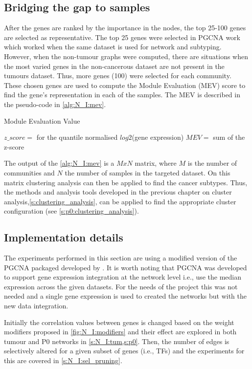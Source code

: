 \subsection{Bridging the gap to samples} \label{s:N_I:mev}

After the genes are ranked by the importance in the nodes, the top 25-100 genes are selected as representative. The top 25 genes were selected in PGCNA work \citep{Care2019-ij} which worked when the same dataset is used for network and subtyping. However, when the non-tumour graphs were computed, there are situations when the most varied genes in the non-cancerous dataset are not present in the tumours dataset. Thus, more genes (100) were selected for each community. These chosen genes are used to compute the Module Evaluation (MEV) score \citep{Care2019-ij} to find the gene's representation in each of the samples. The MEV is described in the pseudo-code in \cref{alg:N_I:mev}.

\begin{algorithm}
\caption{Module Evaluation Value }\label{alg:N_I:mev}
    \begin{algorithmic}
            \State $z\_score=$ for the quantile normalised $log2$(gene expression)
                \State $MEV=$ sum of the z-score  
            \EndFor
        \EndFor
    \EndFor
    \end{algorithmic}
\end{algorithm}

The output of the \cref{alg:N_I:mev} is a $MxN$ matrix, where $M$ is the number of communities and $N$ the number of samples in the targeted dataset. On this matrix clustering analysis can then be applied to find the cancer subtypes. Thus, the methods and analysis tools developed in the previous chapter on cluster analysis,\cref{s:clustering_analysis}, can be applied to find the appropriate cluster configuration (see \cref{s:p0:clustering_analysis}).


\subsection{Implementation details} \label{s:N_I:implementation}

The experiments performed in this section are using a modified version of the PGCNA packaged developed by \citet{Care2019-ij}. It is worth noting that PGCNA was developed to support gene expression integration at the network level i.e., use the median expression across the given datasets. For the needs of the project this was not needed and a single gene expression is used to created the networks but with the new data integration. 

Initially the correlation values between genes is changed based on the weight modifiers proposed in \cref{fig:N_I:modifiers} and their effect are explored in both tumour and P0 networks in \cref{s:N_I:tum,s:p0}. Then, the number of edges is selectively altered for a given subset of genes (i.e., TFs) and the experiments for this are covered in \cref{s:N_I:sel_pruning}. 